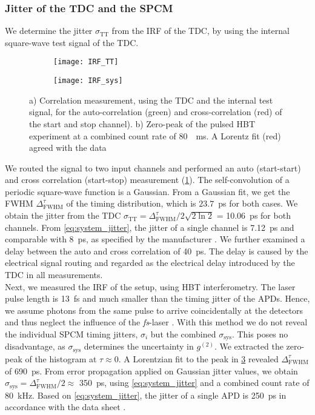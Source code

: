 \subsubsection{Jitter of the TDC and the SPCM}
\noindent We determine the jitter $\sigma_\mathrm{TT}$ from the \ac{IRF} of the \ac{TDC}, by using the internal square-wave test signal of the \ac{TDC}.
\begin{figure}[htp]
	\centering
	\begin{subfigure}{0.49\linewidth}
		\centering
		\texttt{[image: IRF\_TT]}
		\caption{}
		\label{fig:IRF_TT}
	\end{subfigure}
	\hfill
	\begin{subfigure}{0.485\linewidth}
		\centering
		\texttt{[image: IRF\_sys]}
		\caption{}
		\label{fig:IRF_sys}
	\end{subfigure}
	\caption{a) Correlation measurement, using the \ac{TDC} and the internal test signal, for the auto-correlation (green) and cross-correlation (red) of the start and stop channel). b) Zero-peak of the pulsed \ac{HBT} experiment at a combined count rate of \SI{80}{\per\ms}. A Lorentz fit (red) agreed with the data}
\end{figure}
\noindent We routed the signal to two input channels and performed an auto (start-start) and cross correlation (start-stop) measurement (\cref{fig:IRF_TT}). The self-convolution of a periodic square-wave function is a Gaussian. From a Gaussian fit, we get the \ac{FWHM} $\Delta_\mathrm{FWHM}^\tau$ of the timing distribution, which is $23.7$~ps for both cases. We obtain the jitter from the \ac{TDC} $\sigma_\mathrm{TT}=\Delta_\mathrm{FWHM}^\tau/2\sqrt{2\ln2}$ = \SI{10.06}{\ps} for both channels. From \cref{eq:system_jitter}, the jitter of a single channel is \SI{7.12}{\ps} and comparable with \SI{8}{\ps}, as specified by the manufacturer \cite{swabian_instruments_time_2021}. We further examined a delay between the auto and cross correlation of \SI{40}{ps}. The delay is caused by the electrical signal routing and regarded as the electrical delay introduced by the \ac{TDC} in all measurements.\\
Next, we measured the \ac{IRF} of the setup, using \ac{HBT} interferometry. The laser pulse length is \SI{13}{\fs} and much smaller than the timing jitter of the \ac{APD}s. Hence, we assume photons from the same pulse to arrive coincidentally at the detectors and thus neglect the influence of the \textit{fs}-laser \cite{nemallapudi_single_2016}. With this method we do not reveal the individual \ac{SPCM} timing jitters, $\sigma_i$ but the combined $\sigma_\mathrm{sys}$. This poses no disadvantage, as $\sigma_\mathrm{sys}$ determines the uncertainty in $ g^{(2)}$.
We extracted the zero-peak of the histogram at $\tau\approx0$. A Lorentzian fit to the peak in \cref{fig:IRF_sys} revealed $\Delta_\mathrm{FWHM}^\tau$ of \SI{690}{\ps}. From error propagation applied on Gaussian jitter values, we obtain $\sigma_\mathrm{sys}=\Delta_\mathrm{FWHM}^\tau/2\approx$ \SI{350}{\ps}, using \cref{eq:system_jitter} and a combined count rate of \SI{80}{\kHz}. Based on \cref{eq:system_jitter}, the jitter of a single \ac{APD} is \SI{250}{\ps} in accordance with the data sheet \cite{perkin_data_2001}.

